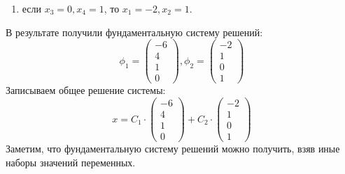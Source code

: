 \documentclass[a4paper,14pt]{article}
\begin{document}
\begin{exmp}
\begin{nonum}
\begin{enumerate}
			\item если $x_3 = 0, x_4 = 1$, то $x_1 = -2, x_2 = 1$.
		\end{enumerate}
		В результате получили фундаментальную систему решений:
		\[
		\phi_1 = \begin{pmatrix}-6 \\ 4 \\ 1 \\ 0\end{pmatrix}, \phi_2 = \begin{pmatrix}-2 \\ 1 \\ 0 \\ 1\end{pmatrix}
		\]
		Записываем общее решение системы:
		\[
		x = C_1 \cdot \begin{pmatrix}-6 \\ 4 \\ 1 \\ 0\end{pmatrix} + C_2 \cdot \begin{pmatrix}-2 \\ 1 \\ 0 \\ 1\end{pmatrix}
		\]
		Заметим, что фундаментальную систему решений можно получить, взяв иные наборы значений переменных.
	\end{nonum}
\end{exmp}
\newpage
\tableofcontents
\end{document}
